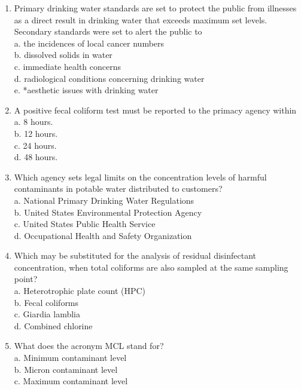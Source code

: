 \begin{enumerate}

\item Primary drinking water standards are set to protect the public from illnesses as a direct result in drinking water that exceeds maximum set levels. Secondary standards were set to alert the public to\\
a. the incidences of local cancer numbers\\
b. dissolved solids in water\\
c. immediate health concerns\\
d. radiological conditions concerning drinking water\\
e. *aesthetic issues with drinking water\\
\item A positive fecal coliform test must be reported to the primacy agency within\\
a. 8 hours.\\
b. 12 hours.\\
c. 24 hours.\\
d. 48 hours.\\
\item Which agency sets legal limits on the concentration levels of harmful contaminants in potable water distributed to customers?\\
a. National Primary Drinking Water Regulations\\
b. United States Environmental Protection Agency\\
c. United States Public Health Service\\
d. Occupational Health and Safety Organization\\
\item Which may be substituted for the analysis of residual disinfectant concentration, when total coliforms are also sampled at the same sampling point?\\
a. Heterotrophic plate count (HPC)\\
b. Fecal coliforms\\
c. Giardia lamblia\\
d. Combined chlorine\\
\item What does the acronym MCL stand for?\\
a. Minimum contaminant level\\
b. Micron contaminant level\\
c. Maximum contaminant level\\

\end{enumerate}

